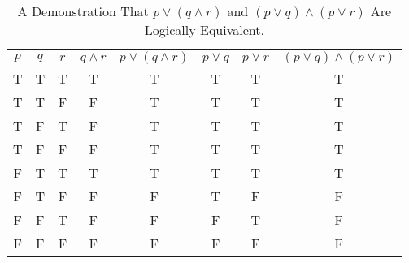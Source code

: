 \documentclass{Axon}
\begin{document}
\begin{table}[h]
    \centering
    \begin{tabular}{ccc|c|c|c|c|c}
    \(p\) & \(q\) & \(r\) & \(q \land r\) & \(p \lor (q \land r)\) & \(p \lor q\) & \(p \lor r\) & \((p \lor q) \land (p \lor r)\) \\
    T     & T     & T     & T             & T                      & T            & T            & T                               \\
    T     & T     & F     & F             & T                      & T            & T            & T                               \\
    T     & F     & T     & F             & T                      & T            & T            & T                               \\
    T     & F     & F     & F             & T                      & T            & T            & T                               \\
    F     & T     & T     & T             & T                      & T            & T            & T                               \\
    F     & T     & F     & F             & F                      & T            & F            & F                               \\
    F     & F     & T     & F             & F                      & F            & T            & F                               \\
    F     & F     & F     & F             & F                      & F            & F            & F
    \end{tabular}
    \caption{A Demonstration That \(p \lor (q \land r)\) and \((p \lor q) \land (p \lor r)\) Are Logically Equivalent.}
    \label{Table: 5}
\end{table}
\end{document}
